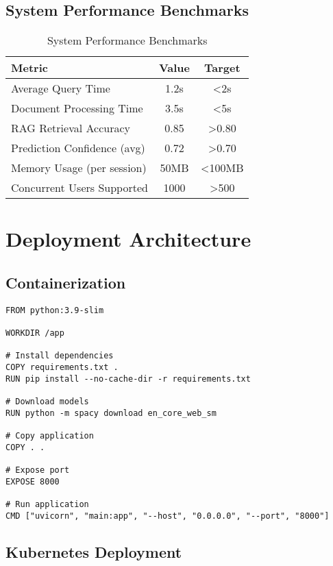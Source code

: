 \documentclass[12pt,a4paper]{article}
\begin{document}
\subsection{System Performance Benchmarks}

\begin{table}[H]
\centering
\begin{tabular}{|l|c|c|}
\hline
\textbf{Metric} & \textbf{Value} & \textbf{Target} \\
\hline
Average Query Time & 1.2s & <2s \\
Document Processing Time & 3.5s & <5s \\
RAG Retrieval Accuracy & 0.85 & >0.80 \\
Prediction Confidence (avg) & 0.72 & >0.70 \\
Memory Usage (per session) & 50MB & <100MB \\
Concurrent Users Supported & 1000 & >500 \\
\hline
\end{tabular}
\caption{System Performance Benchmarks}
\end{table}

\section{Deployment Architecture}

\subsection{Containerization}

\begin{lstlisting}[caption={Dockerfile for Backend Service}]
FROM python:3.9-slim

WORKDIR /app

# Install dependencies
COPY requirements.txt .
RUN pip install --no-cache-dir -r requirements.txt

# Download models
RUN python -m spacy download en_core_web_sm

# Copy application
COPY . .

# Expose port
EXPOSE 8000

# Run application
CMD ["uvicorn", "main:app", "--host", "0.0.0.0", "--port", "8000"]
\end{lstlisting}

\subsection{Kubernetes Deployment}
\end{document}

